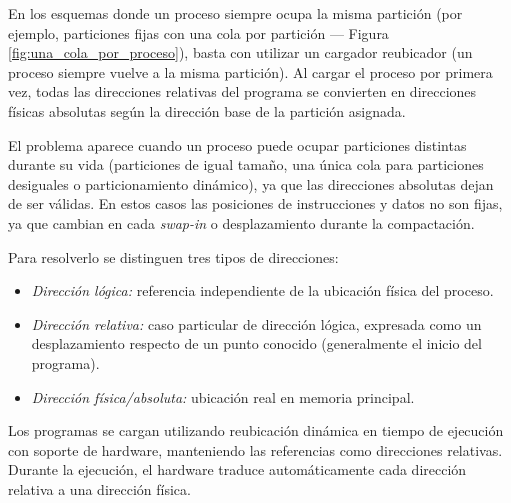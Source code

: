 En los esquemas donde un proceso siempre ocupa la misma partición (por ejemplo, particiones fijas con una cola por partición --- Figura \ref{fig:una_cola_por_proceso}), basta con utilizar un cargador reubicador (un proceso siempre vuelve a la misma partición). Al cargar el proceso por primera vez, todas las direcciones relativas del programa se convierten en direcciones físicas absolutas según la dirección base de la partición asignada.

El problema aparece cuando un proceso puede ocupar particiones distintas durante su vida (particiones de igual tamaño, una única cola para particiones desiguales o particionamiento dinámico), ya que las direcciones absolutas dejan de ser válidas. En estos casos las posiciones de instrucciones y datos no son fijas, ya que cambian en cada \textit{swap-in} o desplazamiento durante la compactación.

Para resolverlo se distinguen tres tipos de direcciones:
\begin{itemize}
  \item \textit{Dirección lógica:} referencia independiente de la ubicación física del proceso.
  \item \textit{Dirección relativa:} caso particular de dirección lógica, expresada como un desplazamiento respecto de un punto conocido (generalmente el inicio del programa).
  \item \textit{Dirección física/absoluta:} ubicación real en memoria principal.
\end{itemize}

Los programas se cargan utilizando reubicación dinámica en tiempo de ejecución con soporte de hardware, manteniendo las referencias como direcciones relativas. Durante la ejecución, el hardware traduce automáticamente cada dirección relativa a una dirección física.

